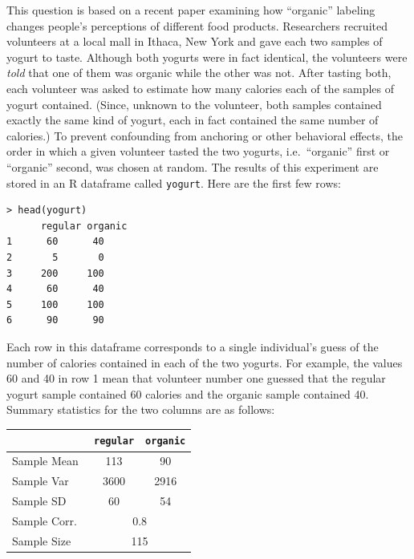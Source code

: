 \documentclass[addpoints,12pt]{exam}
\begin{document}
\begin{questions}
\question This question is based on a recent paper examining how ``organic'' labeling changes people's perceptions of different food products. Researchers recruited volunteers at a local mall in Ithaca, New York and gave each two samples of yogurt to taste. Although both yogurts were in fact identical, the volunteers were \emph{told} that one of them was organic while the other was not. After tasting both, each volunteer was asked to estimate how many calories each of the samples of yogurt contained. (Since, unknown to the volunteer, both samples contained exactly the same kind of yogurt, each in fact contained the same number of calories.) To prevent confounding from anchoring or other behavioral effects, the order in which a given volunteer tasted the two yogurts, i.e.\ ``organic'' first or ``organic'' second, was chosen at random. The results of this experiment are stored in an R dataframe called \texttt{yogurt}. Here are the first few rows:
	\begin{verbatim}
> head(yogurt)
	  regular organic
1      60      40
2       5       0
3     200     100
4      60      40
5     100     100
6      90      90
	\end{verbatim}
Each row in this dataframe corresponds to a single individual's guess of the number of calories contained in each of the two yogurts. For example, the values 60 and 40 in row 1 mean that volunteer number one guessed that the regular yogurt sample contained 60 calories and the organic sample contained 40. Summary statistics for the two columns are as follows:
	\begin{center}
		\begin{tabular}{|lcc|}
		\hline
			& \texttt{regular} & \texttt{organic}\\
			\hline
		Sample Mean & 113 & 90\\
		Sample Var & 3600 & 2916\\
		Sample SD & 60 & 54\\ 
		Sample Corr.\ &\multicolumn{2}{c|}{0.8} \\
		Sample Size &\multicolumn{2}{c|}{115} \\
		\hline
		\end{tabular}
	\end{center}
	\vspace{1em}
\end{questions}
\end{document}

